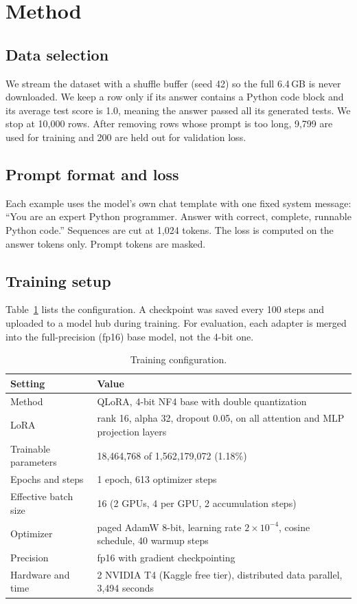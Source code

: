 \documentclass[11pt,a4paper]{article}
\begin{document}
\section{Method}
\subsection{Data selection}
We stream the dataset with a shuffle buffer (seed 42) so the full 6.4\,GB is never downloaded. We keep a row only if its answer contains a Python code block and its average test score is 1.0, meaning the answer passed all its generated tests. We stop at 10,000 rows. After removing rows whose prompt is too long, 9,799 are used for training and 200 are held out for validation loss.

\subsection{Prompt format and loss}
Each example uses the model's own chat template with one fixed system message: ``You are an expert Python programmer. Answer with correct, complete, runnable Python code.'' Sequences are cut at 1,024 tokens. The loss is computed on the answer tokens only. Prompt tokens are masked.

\subsection{Training setup}
Table~\ref{tab:setup} lists the configuration. A checkpoint was saved every 100 steps and uploaded to a model hub during training. For evaluation, each adapter is merged into the full-precision (fp16) base model, not the 4-bit one.

\begin{table}[h]
\centering
\begin{tabularx}{\textwidth}{lX}
\toprule
Setting & Value \\
\midrule
Method & QLoRA, 4-bit NF4 base with double quantization \\
LoRA & rank 16, alpha 32, dropout 0.05, on all attention and MLP projection layers \\
Trainable parameters & 18,464,768 of 1,562,179,072 (1.18\%) \\
Epochs and steps & 1 epoch, 613 optimizer steps \\
Effective batch size & 16 (2 GPUs, 4 per GPU, 2 accumulation steps) \\
Optimizer & paged AdamW 8-bit, learning rate $2\times10^{-4}$, cosine schedule, 40 warmup steps \\
Precision & fp16 with gradient checkpointing \\
Hardware and time & 2 NVIDIA T4 (Kaggle free tier), distributed data parallel, 3,494 seconds \\
\bottomrule
\end{tabularx}
\caption{Training configuration.}
\label{tab:setup}
\end{table}
\end{document}
